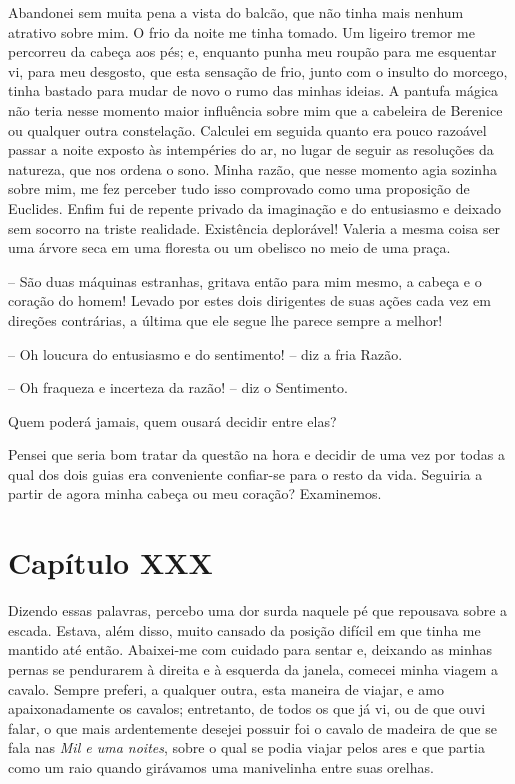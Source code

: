  Abandonei sem muita pena a vista do balcão, que não tinha mais nenhum
atrativo sobre mim. O frio da noite me tinha tomado. Um ligeiro tremor
me percorreu da cabeça aos pés; e, enquanto punha meu roupão para me
esquentar vi, para meu desgosto, que esta sensação de frio, junto com o
insulto do morcego, tinha bastado para mudar de novo o rumo das minhas
ideias. A pantufa mágica não teria nesse momento maior influência sobre
mim que a cabeleira de Berenice ou qualquer outra constelação. Calculei
em seguida quanto era pouco razoável passar a noite exposto às
intempéries do ar, no lugar de seguir as resoluções da natureza, que
nos ordena o sono. Minha razão, que nesse momento agia sozinha sobre
mim, me fez perceber tudo isso comprovado como uma proposição de
Euclides. Enfim fui de repente privado da imaginação e do entusiasmo e
deixado sem socorro na triste realidade. Existência deplorável! Valeria
a mesma coisa ser uma árvore seca em uma floresta ou um obelisco no
meio de uma praça.

 -- São duas máquinas estranhas, gritava então para mim mesmo, a cabeça
e o coração do homem! Levado por estes dois dirigentes de suas ações
cada vez em direções contrárias, a última que ele segue lhe parece
sempre a melhor! 

-- Oh loucura do entusiasmo e do sentimento! -- diz a fria Razão.

-- Oh fraqueza e incerteza da razão! -- diz o Sentimento. 

Quem poderá jamais, quem ousará decidir entre elas?

Pensei que seria bom tratar da questão na hora e decidir de uma vez por
todas a qual dos dois guias era conveniente confiar-se para o resto da
vida. Seguiria a partir de agora minha cabeça ou meu coração?
Examinemos.

\section{Capítulo XXX}

 Dizendo essas palavras, percebo uma dor surda naquele pé que repousava
sobre a escada. Estava, além disso, muito cansado da posição difícil em
que tinha me mantido até então. Abaixei-me com cuidado para sentar e,
deixando as minhas pernas se pendurarem à direita e à esquerda da
janela, comecei minha viagem a cavalo. Sempre preferi, a qualquer
outra, esta maneira de viajar, e amo apaixonadamente os cavalos;
entretanto, de todos os que já vi, ou de que ouvi falar, o que mais
ardentemente desejei possuir foi o cavalo de madeira de que se fala nas
\textit{Mil e uma noites}, sobre o qual se podia viajar pelos ares e
que partia como um raio quando girávamos uma manivelinha entre suas
orelhas.

